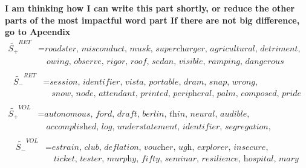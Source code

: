 \documentclass[logo,bsc,singlespacing,parskip]{infthesis}
\begin{document}
\textbf{I am thinking how I can write this part shortly, or reduce the other parts of the most impactful word part If there are not big difference, go to Apeendix}
\begin{align*}
\tilde{S_{+}}^{RET} &= \textit{roadster, misconduct, musk, supercharger, agricultural, detriment, cluster, } \\
               &\quad \textit{owing, observe, rigor, roof, sedan, visible, ramping, dangerous} \\
\end{align*}
\begin{align*}
\tilde{S_{-}}^{RET} &= \textit{session, identifier, vista, portable, dram, snap, wrong,} \\
               &\quad \textit{snow, node, attendant, printed, peripheral, palm, composed, pride} \\
\end{align*}
\begin{align*}
\tilde{S_{+}}^{VOL} &= \textit{autonomous, ford, draft, berlin, thin, neural, audible,} \\
               &\quad \textit{accomplished, log, understatement, identifier, segregation, subjectivity, race, pilot} \\
\end{align*}
\begin{align*}
\tilde{S_{-}}^{VOL} &= \textit{estrain, club, deflation, voucher, ugh, explorer, insecure,} \\
               &\quad \textit{ticket, tester, murphy, fifty, seminar, resilience, hospital, mary} \\
\end{align*}

\end{document}
